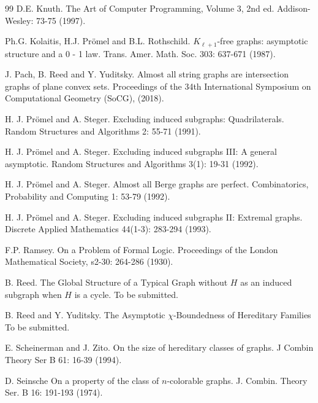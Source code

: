 \documentclass[12pt]{article}
\theoremstyle{definition}
\begin{document}
\begin{thebibliography}{99}
 D.E. Knuth. 
\newblock The Art of Computer Programming, Volume 3, 2nd ed.
\newblock Addison-Wesley: 73-75 (1997).

 Ph.G. Kolaitis, H.J. Pr{\"o}mel and B.L. Rothschild.
\newblock $K_{\ell+1}$-free graphs: asymptotic structure and a 0 - 1 law.
\newblock Trans. Amer. Math. Soc. 303: 637-671 (1987).

 J. Pach, B. Reed and Y. Yuditsky.
\newblock Almost all string graphs are intersection graphs of plane convex sets.
\newblock Proceedings of the 34th International Symposium on Computational Geometry (SoCG), (2018).

 H. J. Pr{\"o}mel and A. Steger.
\newblock Excluding induced subgraphs: Quadrilaterals.
\newblock Random Structures and Algorithms 2: 55-71 (1991).

 H. J. Pr{\"o}mel and A. Steger.
\newblock Excluding induced subgraphs III: A general asymptotic.
\newblock Random Structures and Algorithms 3(1): 19-31 (1992).

 H. J. Pr{\"o}mel and A. Steger.
\newblock Almost all Berge graphs are perfect.
\newblock Combinatorics, Probability and Computing 1: 53-79 (1992).

 H. J. Pr{\"o}mel and A. Steger.
\newblock Excluding induced subgraphs II: Extremal graphs.
\newblock Discrete Applied Mathematics 44(1-3): 283-294 (1993).

 F.P. Ramsey.
\newblock On a Problem of Formal Logic. 
\newblock Proceedings of the London Mathematical Society, s2-30: 264-286 (1930).

 B. Reed. 
\newblock The Global Structure of a Typical Graph without $H$ as an induced subgraph when $H$ is a cycle.
\newblock To be submitted. 

 B. Reed and Y. Yuditsky. 
\newblock The Asymptotic $\chi$-Boundedness of Hereditary Families
\newblock To be submitted. 

 E. Scheinerman and J. Zito.
\newblock On the size of hereditary classes of graphs.
\newblock J Combin Theory Ser B 61: 16-39 (1994).

 D. Seinsche
\newblock On a property of the class of $n$-colorable graphs.
\newblock J. Combin. Theory Ser. B 16: 191-193 (1974).


\end{thebibliography}
\end{document}
